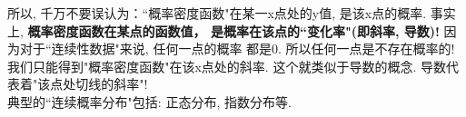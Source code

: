 \documentclass[UTF8]{ctexart}
\begin{document}
	所以, 千万不要误认为：``概率密度函数"在某一x点处的y值, 是该x点的概率. 事实上, \textbf{概率密度函数在某点的函数值， 是概率在该点的``变化率"(即斜率, 导数)!}  因为对于``连续性数据"来说, 任何一点的概率 都是0. 所以任何一点是不存在概率的! 我们只能得到"概率密度函数"在该x点处的斜率. 这个就类似于导数的概念. 导数代表着"该点处切线的斜率"! \\
	
	
	
	典型的``连续概率分布"包括: 正态分布, 指数分布等.
	
	
	
	
	
	
\end{document}
